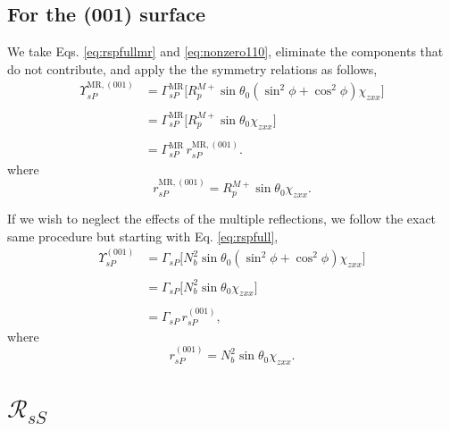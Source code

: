 \subsection{For the (001) surface}

We take Eqs. \eqref{eq:rspfullmr} and \eqref{eq:nonzero110}, eliminate the
components that do not contribute, and apply the the symmetry relations as
follows,
\begin{equation*}
\begin{split}
\Upsilon^{\mathrm{MR},(001)}_{sP} &=
\Gamma^{\mathrm{MR}}_{sP}
\big[
R^{M+}_{p}\sin\theta_{0}(\sin^{2}\phi + \cos^{2}\phi)\chi_{zxx}
\big]\\\\
&=
\Gamma^{\mathrm{MR}}_{sP}
\big[
R^{M+}_{p}\sin\theta_{0}\chi_{zxx}
\big]\\\\
&= \Gamma^{\mathrm{MR}}_{sP}\,r^{\mathrm{MR},(001)}_{sP}.
\end{split}
\end{equation*}
where
\begin{equation}\label{eq:final-rsp.mr.001}
r^{\mathrm{MR},(001)}_{sP} = 
R^{M+}_{p}\sin\theta_{0}\chi_{zxx}.
\end{equation}

If we wish to neglect the effects of the multiple reflections, we follow the
exact same procedure but starting with Eq. \eqref{eq:rspfull},
\begin{equation*}
\begin{split}
\Upsilon^{(001)}_{sP} &=
\Gamma_{sP}
\big[
N^{2}_{b}\sin\theta_{0}(\sin^{2}\phi + \cos^{2}\phi)\chi_{zxx}
\big]\\\\
&=
\Gamma_{sP}
\big[
N^{2}_{b}\sin\theta_{0}\chi_{zxx}
\big]\\\\
&=
\Gamma_{sP}\,r^{(001)}_{sP},
\end{split}
\end{equation*}
where
\begin{equation}\label{eq:final-rsp.001}
r^{(001)}_{sP} = 
N^{2}_{b}\sin\theta_{0}\chi_{zxx}.
\end{equation}




\section{\texorpdfstring{$\mathcal{R}_{sS}$}{RsS}}

